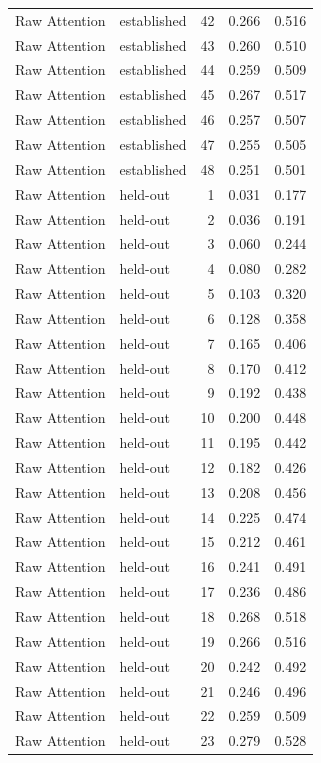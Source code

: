 \begin{tabular}{llrrr}
Raw Attention & established & 42 & 0.266 & 0.516 \\
Raw Attention & established & 43 & 0.260 & 0.510 \\
Raw Attention & established & 44 & 0.259 & 0.509 \\
Raw Attention & established & 45 & 0.267 & 0.517 \\
Raw Attention & established & 46 & 0.257 & 0.507 \\
Raw Attention & established & 47 & 0.255 & 0.505 \\
Raw Attention & established & 48 & 0.251 & 0.501 \\
Raw Attention & held-out & 1 & 0.031 & 0.177 \\
Raw Attention & held-out & 2 & 0.036 & 0.191 \\
Raw Attention & held-out & 3 & 0.060 & 0.244 \\
Raw Attention & held-out & 4 & 0.080 & 0.282 \\
Raw Attention & held-out & 5 & 0.103 & 0.320 \\
Raw Attention & held-out & 6 & 0.128 & 0.358 \\
Raw Attention & held-out & 7 & 0.165 & 0.406 \\
Raw Attention & held-out & 8 & 0.170 & 0.412 \\
Raw Attention & held-out & 9 & 0.192 & 0.438 \\
Raw Attention & held-out & 10 & 0.200 & 0.448 \\
Raw Attention & held-out & 11 & 0.195 & 0.442 \\
Raw Attention & held-out & 12 & 0.182 & 0.426 \\
Raw Attention & held-out & 13 & 0.208 & 0.456 \\
Raw Attention & held-out & 14 & 0.225 & 0.474 \\
Raw Attention & held-out & 15 & 0.212 & 0.461 \\
Raw Attention & held-out & 16 & 0.241 & 0.491 \\
Raw Attention & held-out & 17 & 0.236 & 0.486 \\
Raw Attention & held-out & 18 & 0.268 & 0.518 \\
Raw Attention & held-out & 19 & 0.266 & 0.516 \\
Raw Attention & held-out & 20 & 0.242 & 0.492 \\
Raw Attention & held-out & 21 & 0.246 & 0.496 \\
Raw Attention & held-out & 22 & 0.259 & 0.509 \\
Raw Attention & held-out & 23 & 0.279 & 0.528 \\

\end{tabular}
